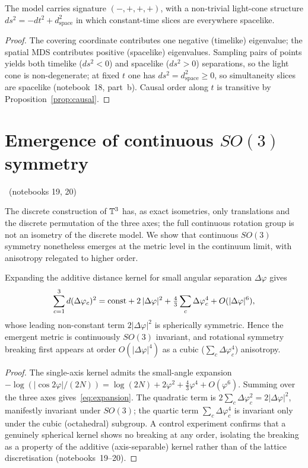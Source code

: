 \documentclass[11pt]{article}
\begin{document}
\begin{proposition}\label{prop:signature}
The model carries signature $(-,+,+,+)$, with a non-trivial light-cone structure
$ds^2=-dt^2+d_{\text{space}}^2$ in which constant-time slices are everywhere spacelike.
\end{proposition}

\begin{proof}
The covering coordinate contributes one negative (timelike) eigenvalue; the spatial MDS
contributes positive (spacelike) eigenvalues. Sampling pairs of points yields both
timelike ($ds^2<0$) and spacelike ($ds^2>0$) separations, so the light cone is
non-degenerate; at fixed $t$ one has $ds^2=d_{\text{space}}^2\ge0$, so simultaneity slices
are spacelike (notebook~18, part~b). Causal order along $t$ is transitive by
Proposition~\ref{prop:causal}.
\end{proof}

\section{Emergence of continuous $SO(3)$ symmetry}\label{sec:so3}
\established\ (notebooks 19, 20)

The discrete construction of $\mathbb{T}^{3}$ has, as exact isometries, only translations and
the discrete permutation of the three axes; the full continuous rotation group is not an
isometry of the discrete model. We show that continuous $SO(3)$ symmetry nonetheless
emerges at the metric level in the continuum limit, with anisotropy relegated to higher
order.

\begin{theorem}\label{thm:so3}
Expanding the additive distance kernel for small angular separation $\Delta\varphi$ gives
\begin{equation}
\sum_{c=1}^{3}d(\Delta\varphi_c)^2
= \text{const} + 2\,|\Delta\varphi|^2
+ \tfrac{4}{3}\sum_{c}\Delta\varphi_c^{4} + O(|\Delta\varphi|^{6}),
\label{eq:expansion}
\end{equation}
whose leading non-constant term $2|\Delta\varphi|^2$ is spherically symmetric. Hence the
emergent metric is continuously $SO(3)$ invariant, and rotational symmetry breaking first
appears at order $O(|\Delta\varphi|^4)$ as a cubic ($\sum_c\Delta\varphi_c^4$) anisotropy.
\end{theorem}

\begin{proof}
The single-axis kernel admits the small-angle expansion
$-\log(|\cos2\varphi|/(2N)) = \log(2N) + 2\varphi^2 + \tfrac{4}{3}\varphi^4 + O(\varphi^6)$.
Summing over the three axes gives~\eqref{eq:expansion}. The quadratic term is
$2\sum_c\Delta\varphi_c^2=2|\Delta\varphi|^2$, manifestly invariant under $SO(3)$; the
quartic term $\sum_c\Delta\varphi_c^4$ is invariant only under the cubic (octahedral)
subgroup. A control experiment confirms that a genuinely spherical kernel shows no
breaking at any order, isolating the breaking as a property of the additive
(axis-separable) kernel rather than of the lattice discretisation (notebooks~19--20).
\end{proof}
\end{document}
